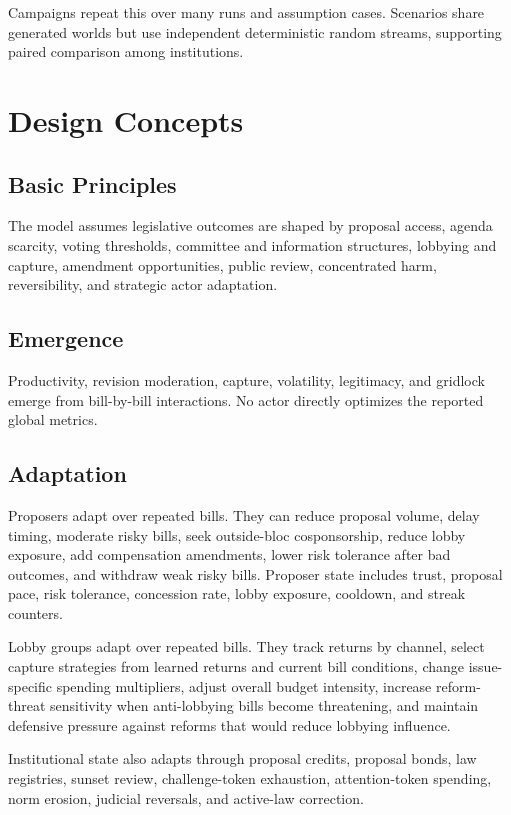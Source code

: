 \documentclass[manuscript]{acmart}
\begin{document}
Campaigns repeat this over many runs and assumption cases. Scenarios share generated worlds but use independent deterministic random streams, supporting paired comparison among institutions.

\section{Design Concepts}

\subsection{Basic Principles}

The model assumes legislative outcomes are shaped by proposal access, agenda scarcity, voting thresholds, committee and information structures, lobbying and capture, amendment opportunities, public review, concentrated harm, reversibility, and strategic actor adaptation.

\subsection{Emergence}

Productivity, revision moderation, capture, volatility, legitimacy, and gridlock emerge from bill-by-bill interactions. No actor directly optimizes the reported global metrics.

\subsection{Adaptation}

Proposers adapt over repeated bills. They can reduce proposal volume, delay timing, moderate risky bills, seek outside-bloc cosponsorship, reduce lobby exposure, add compensation amendments, lower risk tolerance after bad outcomes, and withdraw weak risky bills. Proposer state includes trust, proposal pace, risk tolerance, concession rate, lobby exposure, cooldown, and streak counters.

Lobby groups adapt over repeated bills. They track returns by channel, select capture strategies from learned returns and current bill conditions, change issue-specific spending multipliers, adjust overall budget intensity, increase reform-threat sensitivity when anti-lobbying bills become threatening, and maintain defensive pressure against reforms that would reduce lobbying influence.

Institutional state also adapts through proposal credits, proposal bonds, law registries, sunset review, challenge-token exhaustion, attention-token spending, norm erosion, judicial reversals, and active-law correction.
\end{document}
